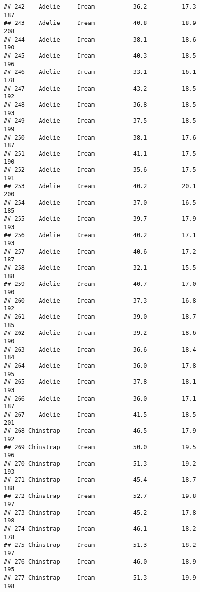 \documentclass[
]{article}
\begin{document}
\begin{verbatim}
## 242    Adelie     Dream           36.2          17.3               187
## 243    Adelie     Dream           40.8          18.9               208
## 244    Adelie     Dream           38.1          18.6               190
## 245    Adelie     Dream           40.3          18.5               196
## 246    Adelie     Dream           33.1          16.1               178
## 247    Adelie     Dream           43.2          18.5               192
## 248    Adelie     Dream           36.8          18.5               193
## 249    Adelie     Dream           37.5          18.5               199
## 250    Adelie     Dream           38.1          17.6               187
## 251    Adelie     Dream           41.1          17.5               190
## 252    Adelie     Dream           35.6          17.5               191
## 253    Adelie     Dream           40.2          20.1               200
## 254    Adelie     Dream           37.0          16.5               185
## 255    Adelie     Dream           39.7          17.9               193
## 256    Adelie     Dream           40.2          17.1               193
## 257    Adelie     Dream           40.6          17.2               187
## 258    Adelie     Dream           32.1          15.5               188
## 259    Adelie     Dream           40.7          17.0               190
## 260    Adelie     Dream           37.3          16.8               192
## 261    Adelie     Dream           39.0          18.7               185
## 262    Adelie     Dream           39.2          18.6               190
## 263    Adelie     Dream           36.6          18.4               184
## 264    Adelie     Dream           36.0          17.8               195
## 265    Adelie     Dream           37.8          18.1               193
## 266    Adelie     Dream           36.0          17.1               187
## 267    Adelie     Dream           41.5          18.5               201
## 268 Chinstrap     Dream           46.5          17.9               192
## 269 Chinstrap     Dream           50.0          19.5               196
## 270 Chinstrap     Dream           51.3          19.2               193
## 271 Chinstrap     Dream           45.4          18.7               188
## 272 Chinstrap     Dream           52.7          19.8               197
## 273 Chinstrap     Dream           45.2          17.8               198
## 274 Chinstrap     Dream           46.1          18.2               178
## 275 Chinstrap     Dream           51.3          18.2               197
## 276 Chinstrap     Dream           46.0          18.9               195
## 277 Chinstrap     Dream           51.3          19.9               198

\end{verbatim}
\end{document}
